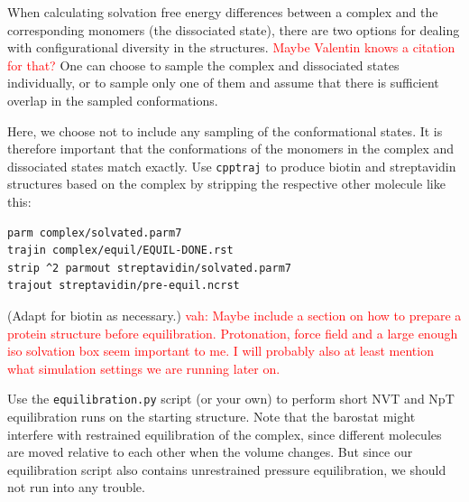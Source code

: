 \documentclass[9pt,tutorial]{livecoms}
\newcommand{\software}{\texttt}
\newcommand{\todo}{\textcolor{red}}
\begin{document}
When calculating solvation free energy differences between a complex and the corresponding monomers (the dissociated state), there are two options for dealing with configurational diversity in the structures.
\todo{Maybe Valentin knows a citation for that?}
One can choose to sample the complex and dissociated states individually, or to sample only one of them and assume that there is sufficient overlap in the sampled conformations.

Here, we choose not to include any sampling of the conformational states. 
It is therefore important that the conformations of the monomers in the complex and dissociated states match exactly. 
Use \software{cpptraj} to produce biotin and streptavidin structures based on the complex by stripping the respective other molecule like this:
\begin{lstlisting}
parm complex/solvated.parm7
trajin complex/equil/EQUIL-DONE.rst
strip ^2 parmout streptavidin/solvated.parm7
trajout streptavidin/pre-equil.ncrst
\end{lstlisting}
(Adapt for biotin as necessary.)
\todo{vah: Maybe include a section on how to prepare a protein structure before equilibration. Protonation, force field and a large enough iso solvation box seem important to me. I will probably also at least mention what simulation settings we are running later on.}

Use the \software{equilibration.py} script (or your own) to perform short NVT and NpT equilibration runs on the starting structure.
Note that the barostat might interfere with restrained equilibration of the complex, since different molecules are moved relative to each other when the volume changes.
But since our equilibration script also contains unrestrained pressure equilibration, we should not run into any trouble.
\end{document}
